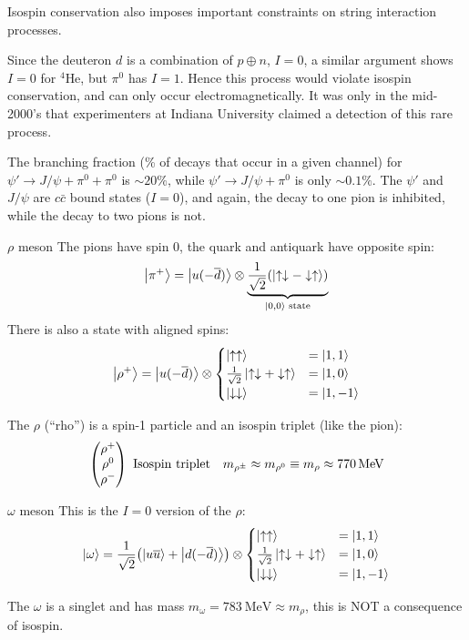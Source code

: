 Isospin conservation also imposes important constraints on string interaction processes.

\begin{example}[$d+d\to \,^4\text{He}+\pi^0$]
  Since the deuteron $d$ is a combination of $p\oplus n$, $I=0$, a similar argument shows $I=0$ for $^4\text{He}$, but $\pi^0$ has $I=1$. Hence this process would violate isospin conservation, and can only occur electromagnetically. It was only in the mid-2000's that experimenters at Indiana University claimed a detection of this rare process.
\end{example}

\begin{example}
  The branching fraction (\% of decays that occur in a given channel) for $\psi'\to J/\psi+\pi^0+\pi^0$ is $\sim20\%$, while $\psi'\to J/\psi+\pi^0$ is only $\sim0.1\%$. The $\psi'$ and $J/\psi$ are $c\bar{c}$ bound states ($I=0$), and again, the decay to one pion is inhibited, while the decay to two pions is not.
\end{example}

\begin{definition}{$\rho$ meson}
  The pions have spin $0$, the quark and antiquark have opposite spin:
  \begin{align*}
    \ket{\pi^+}=\ket{u(-\overline{d})}\otimes\underbrace{\frac1{\sqrt{2}}
      \qty(\ket{\uparrow\downarrow-\downarrow\uparrow})}
    _{\ket{0,0}\text{ state}}
  \end{align*}
  There is also a state with aligned spins:
  \begin{align*}
    \ket{\rho^+}=\ket{u(-\overline{d})}\otimes
    \begin{cases}
      \ket{\uparrow\uparrow} & =\ket{1,1} \\
      \frac1{\sqrt{2}}\ket{\uparrow\downarrow+\downarrow\uparrow}
      & =\ket{1,0} \\
      \ket{\downarrow\downarrow} & =\ket{1,-1}
    \end{cases}
  \end{align*}
\end{definition}
The $\rho$ (``rho'') is a spin-1 particle and an isospin triplet (like the pion):
\begin{align*}
  \pmqty{\rho^+\\\rho^0\\\rho^-}\text{ Isospin triplet}\quad
  m_{\rho^\pm}\approx m_{\rho^0}\equiv m_{\rho}\approx\SI{770}{\MeV}
\end{align*}

\begin{definition}{$\omega$ meson}
  This is the $I=0$ version of the $\rho$:
  \begin{align*}
    \ket{\omega}=\frac1{\sqrt{2}}\qty(\ket{u\overline{u}}+\ket{d(-\overline{d})})
    \otimes
    \begin{cases}
      \ket{\uparrow\uparrow} & =\ket{1,1} \\
      \frac1{\sqrt{2}}\ket{\uparrow\downarrow+\downarrow\uparrow}
      & =\ket{1,0} \\
      \ket{\downarrow\downarrow} & =\ket{1,-1}
    \end{cases}
  \end{align*}
\end{definition}
The $\omega$ is a singlet and has mass $m_\omega=\SI{783}{\MeV}\approx m_\rho$, this is NOT a consequence of isospin.

